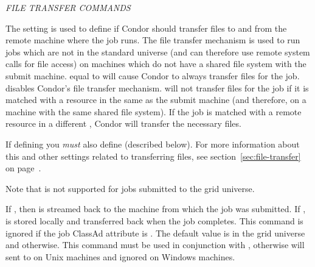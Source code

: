 \emph{FILE TRANSFER COMMANDS}
\begin{description} 


\item[should\_transfer\_files = $<$YES \Bar\ NO \Bar\ IF\_NEEDED $>$] 
The  setting is used to define if Condor
should transfer files to and from the remote machine where the job
runs.
The file transfer mechanism is used to run jobs which are not in the
standard universe (and can therefore use remote system calls for file
access) on machines which do not have a shared file system with the
submit machine.
 equal to  will cause Condor to
always transfer files for the job.
 disables Condor's file transfer mechanism.
 will not transfer files for the job if it is matched
with a resource in the same  as the submit
machine (and therefore, on a machine with the same shared file
system).
If the job is matched with a remote resource in a different 
, Condor will transfer the necessary files. 

If defining  you \emph{must} also
define  (described below).
For more information about this and other settings related to
transferring files, see section~\ref{sec:file-transfer} on
page~\pageref{sec:file-transfer}.

Note that  is not supported
for jobs submitted to the grid universe.

\item[stream\_error = $<$True \Bar\ False$>$]
If , then  is streamed back to
the machine from which the job was submitted.
If ,  is stored locally
and transferred back when the job completes.
This command is ignored if the job ClassAd attribute
 is
.
The default value is  in the grid
universe and  otherwise.
This command must be used in conjunction with 
, otherwise  will
sent to  on Unix machines and
ignored on Windows machines.


\end{description}
